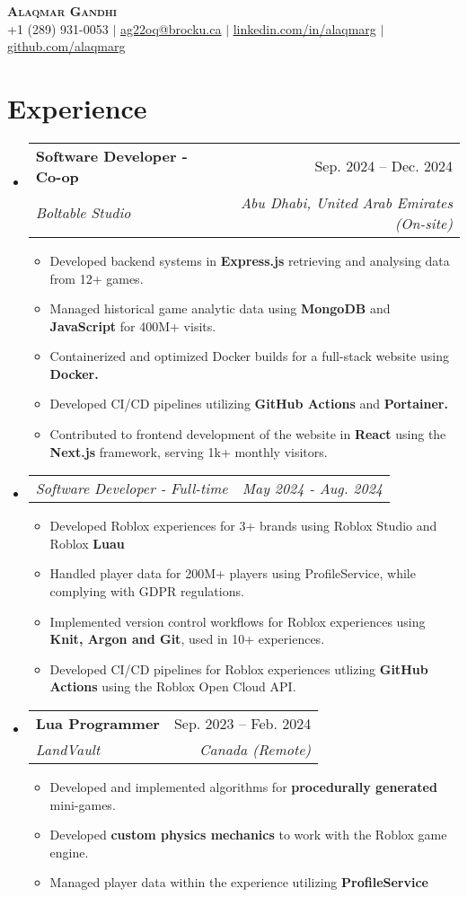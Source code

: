 \documentclass[letterpaper,11pt]{article}
\makeatletter
\newcommand{\resumeItem}[1]{
  \item\small{
    {#1 \vspace{-2pt}}
  }
}
\newcommand{\resumeSubheading}[4]{
  \vspace{-2pt}\item
    \begin{tabular*}{0.97\textwidth}[t]{l@{\extracolsep{\fill}}r}
      \textbf{#1} & #2 \\
      \textit{\small#3} & \textit{\small #4} \\
    \end{tabular*}\vspace{-7pt}
}
\newcommand{\resumeSubSubheading}[2]{
    \item
    \begin{tabular*}{0.97\textwidth}{l@{\extracolsep{\fill}}r}
      \textit{\small#1} & \textit{\small #2} \\
    \end{tabular*}\vspace{-7pt}
}
\newcommand{\resumeSubHeadingListStart}{\begin{itemize}[leftmargin=0.15in, label={}]}
\newcommand{\resumeSubHeadingListEnd}{\end{itemize}}
\newcommand{\resumeItemListStart}{\begin{itemize}}
\newcommand{\resumeItemListEnd}{\end{itemize}\vspace{-5pt}}
\makeatother
\begin{document}
\begin{center}
    \textbf{\Huge \scshape Alaqmar Gandhi} \\ \vspace{1pt}
    \small +1 (289) 931-0053 $|$ \href{mailto:ag22oq@brocku.ca}{\underline{ag22oq@brocku.ca}} $|$ 
    \href{https://linkedin.com/in/alaqmarg}{\underline{linkedin.com/in/alaqmarg}} $|$
    \href{https://github.com/alaqmarg}{\underline{github.com/alaqmarg}}
\end{center}

\section{Experience}
  \resumeSubHeadingListStart

    \resumeSubheading
      {Software Developer - Co-op}{Sep. 2024 -- Dec. 2024}
      {Boltable Studio}{Abu Dhabi, United Arab Emirates (On-site)}
      \resumeItemListStart
        \resumeItem{Developed backend systems in \textbf{Express.js} retrieving and analysing data from 12+ games. }
        \resumeItem{Managed historical game analytic data using \textbf{MongoDB} and \textbf{JavaScript} for 400M+ visits.}
        \resumeItem{Containerized and optimized Docker builds for a full-stack website using \textbf{Docker.}}
        \resumeItem{Developed CI/CD pipelines utilizing \textbf{GitHub Actions} and \textbf{Portainer.}}
        \resumeItem{Contributed to frontend development of the website in \textbf{React} using the \textbf{Next.js} framework, serving 1k+ monthly visitors.}
      \resumeItemListEnd

    \resumeSubSubheading
    {Software Developer - Full-time}{May 2024 - Aug. 2024}
      \resumeItemListStart
        \resumeItem{Developed Roblox experiences for 3+ brands using Roblox Studio and Roblox \textbf{Luau}}
        \resumeItem{Handled player data for 200M+ players using ProfileService, while complying with GDPR regulations.}
        \resumeItem{Implemented version control workflows for Roblox experiences using \textbf{Knit, Argon and Git}, used in 10+ experiences.}
        \resumeItem{Developed CI/CD pipelines for Roblox experiences utlizing \textbf{GitHub Actions} using the Roblox Open Cloud API.}
      \resumeItemListEnd

    \resumeSubheading
      {Lua Programmer}{Sep. 2023 -- Feb. 2024}
      {LandVault}{Canada (Remote)}
      \resumeItemListStart
        \resumeItem{Developed and implemented algorithms for \textbf{procedurally generated} mini-games.}
        \resumeItem{Developed \textbf{custom physics mechanics} to work with the Roblox game engine.}
        \resumeItem{Managed player data within the experience utilizing \textbf{ProfileService}}
      \resumeItemListEnd
  \resumeSubHeadingListEnd
\end{document}
